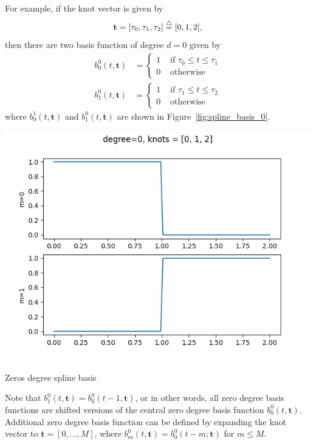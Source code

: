 \par{}

For example, if the knot vector is given by
\[
\mathbf{t} = [\tau_0, \tau_1, \tau_2] \stackrel{\triangle}{=} [0, 1, 2],
\]
then there are two basis function of degree $d=0$ given by
\begin{align*}
b_0^0(t,\mathbf{t}) &= \begin{cases} 1 & \text{~if~} \tau_0 \leq t \leq \tau_1 \\ 
 									 0 & \text{~otherwise} 
 			\end{cases}
\\ 
b_1^0(t,\mathbf{t}) &= \begin{cases} 1 & \text{~if~} \tau_1 \leq t \leq \tau_2 \\ 
 									 0 & \text{~otherwise}
 			\end{cases}
\end{align*}
where $b_0^1(t,\mathbf{t})$ and $b_1^0(t,\mathbf{t})$ are shown in Figure~\ref{fig:spline_basis_0}.
\begin{marginfigure}[0in]
  \includegraphics[width=\linewidth]{./chap5_trajectory_planning/figures/spline_basis_0}
  \caption{Zeros degree spline basis}
  \label{fig:spline_basis_0}  
\end{marginfigure}
Note that $b_1^0(t,\mathbf{t}) = b_0^0(t-1,\mathbf{t})$, or in other words, all zero degree basis functions are shifted versions of the central zero degree basis function $b_0^0(t,  \mathbf{t})$.  Additional zero degree basis function can be defined by expanding the knot vector to $\mathbf{t}=[0, \dots, M]$, where $b_m^0(t,  \mathbf{t})= b_0^0(t-m; \mathbf{t})$ for $m\leq M$.


